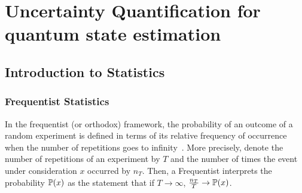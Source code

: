 \chapter{Uncertainty Quantification for quantum state estimation}
\label{chap:error}


\section{Introduction to Statistics}
\label{sec:error.intro}


\subsection{Frequentist Statistics}
\label{sub:intro.frequentist}


In the frequentist (or orthodox) framework, the probability of an outcome of a random experiment is defined in terms of its relative frequency of occurrence when the number of repetitions goes to infinity~\cite{Keynes_2007_Treatise,Kiefer_2012_Introduction}.
More precisely, denote the number of repetitions of an experiment by $T$ and the number of times the event under consideration $x$ occurred by $n_T$. 
Then, a Frequentist interprets the probability $\mathbb{P}(x)$ as the statement that if $T \to \infty$, $\frac{n_T}{T} \to \mathbb{P}(x)$.

